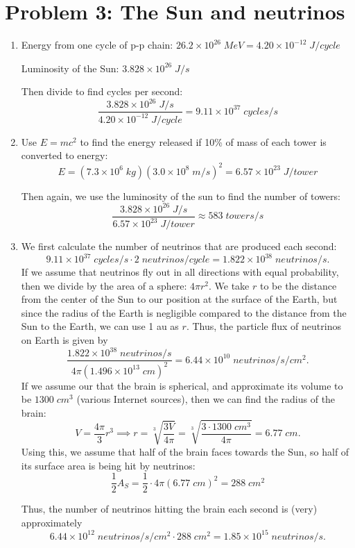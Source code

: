 \documentclass[11pt,letterpaper]{article}
\begin{document}
\section*{Problem 3: The Sun and neutrinos}
\begin{enumerate}[label=(\alph*)]
    \item 
    Energy from one cycle of p-p chain: $26.2\times 10^{26} \;\si{MeV} = 4.20\times 10^{-12}\;\si{J/cycle}$
    
    Luminosity of the Sun: $3.828 \times 10^{26} \;\si{J/s}$
    
    Then divide to find cycles per second: $$\frac{3.828 \times 10^{26} \;\si{J/s}}{4.20\times 10^{-12}\;\si{J/cycle}} = 9.11\times 10^{37}\;\si{cycles/s}$$
    
    \item
    Use $E=mc^2$ to find the energy released if 10\% of mass of each tower is converted to energy: $$E=(7.3\times 10^6\;\si{kg}) (3.0\times 10^8\;\si{m/s})^2 = 6.57\times 10^{23}\;\si{J/tower}$$
    
    Then again, we use the luminosity of the sun to find the number of towers: $$\frac{3.828\times 10^{26}\;\si{J/s}}{6.57\times 10^{23}\;\si{J/tower}} \approx 583\;\si{towers/s}$$
    
    \item
    We first calculate the number of neutrinos that are produced each second: $$9.11\times 10^{37}\;\si{cycles/s}\cdot 2\;\si{neutrinos/cycle} = 1.822\times 10^{38}\;\si{neutrinos/s}.$$ If we assume that neutrinos fly out in all directions with equal probability, then we divide by the area of a sphere: $4\pi r^2.$ We take $r$ to be the distance from the center of the Sun to our position at the surface of the Earth, but since the radius of the Earth is negligible compared to the distance from the Sun to the Earth, we can use 1 au as $r$. Thus, the particle flux of neutrinos on Earth is given by $$\frac{1.822\times 10^{38}\;\si{neutrinos/s}}{4\pi(1.496\times 10^{13}\;\si{cm})^2} = 6.44\times 10^{10}\;\si{neutrinos/s/cm^2}.$$ If we assume our that the brain is spherical, and approximate its volume to be $1300\;\si{cm^3}$ (various Internet sources), then we can find the radius of the brain: $$V = \frac{4\pi}{3}r^3 \implies r = \sqrt[3]{\frac{3V}{4\pi}} = \sqrt[3]{\frac{3\cdot 1300\;\si{cm^3}}{4\pi}} = 6.77\;\si{cm}.$$ Using this, we assume that half of the brain faces towards the Sun, so half of its surface area is being hit by neutrinos: $$\frac{1}{2} A_S = \frac{1}{2} \cdot 4\pi (6.77\;\si{cm})^2 = 288\;\si{cm^2}$$ 
    
    Thus, the number of neutrinos hitting the brain each second is (very) approximately $$6.44\times 10^{12}\;\si{neutrinos/s/cm^2} \cdot 288\;\si{cm^2} = 1.85\times 10^{15}\;\si{neutrinos/s}.$$
    
\end{enumerate}
\end{document}
